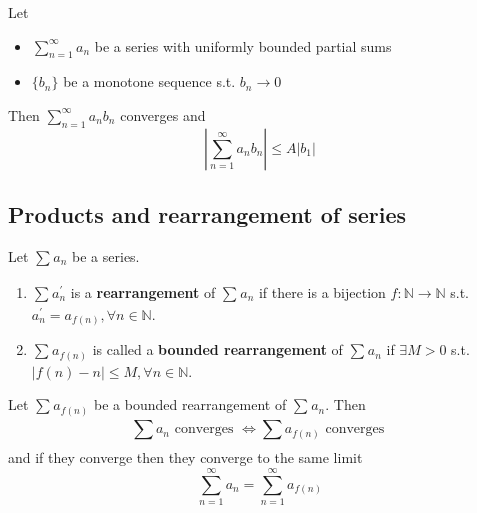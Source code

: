 \begin{theorem}
    \label{thm:dirichlet-convergence-test}
    Let 
    \begin{itemize}
        \item $\sum\limits_{n=1}^{\infty} a_n$ be a series with
        uniformly bounded partial sums
        \item $\{ b_n \} $ be a monotone sequence s.t. 
        $b_n \to 0$
    \end{itemize} 
    Then 
    $\sum\limits_{n=1}^{\infty} a_n b_n$ converges and 
    \[
    \left| 
        \sum\limits_{n=1}^{\infty} 
        a_nb_n
    \right|  
    \leq A \left| b_1 \right| 
    \]
    
\end{theorem}

\subsection{Products and rearrangement of series}

\begin{definition}
    Let $\sum\limits_{}^{} a_n$ be a series. 
    \begin{enumerate}
        \item $\sum\limits_{}^{} a_n^{\prime}$ is a \textbf{rearrangement}
        of $\sum\limits_{}^{} a_n$ if there is a bijection 
        $f: \mathbb{N} \to \mathbb{N}$ s.t. 
        $a_n^{\prime} = a_{f(n)}, \forall n \in \mathbb{N}$.
        \item $\sum\limits_{}^{} a_{f(n)}$ is called a \textbf{bounded rearrangement}
        of $\sum\limits_{}^{} a_n$ if $\exists M > 0$ s.t. 
        $|f(n) - n| \leq M, \forall n \in \mathbb{N}$.
    \end{enumerate} 
\end{definition}

\begin{theorem}
    Let $\sum\limits_{}^{} a_{f(n)}$ be a bounded rearrangement 
    of $\sum\limits_{}^{} a_n$. Then
    \[
        \sum\limits_{}^{} a_n \text{ converges } 
        \iff
        \sum\limits_{}^{} a_{f(n)} \text{ converges } 
    \]
    and if they converge then they converge to the same limit
    \[
        \sum\limits_{n = 1}^{\infty} a_{n} =
        \sum\limits_{n = 1}^{\infty} a_{f(n)}
    \]
\end{theorem}

